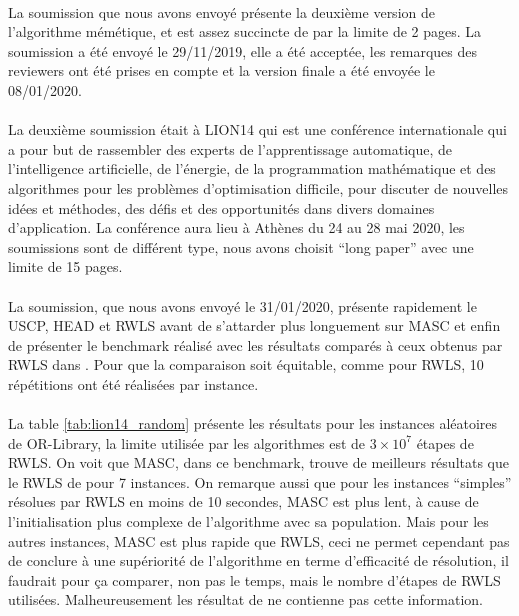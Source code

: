 \documentclass[a4paper,11pt,twoside,french,report]{../common/simplem}
\begin{document}
				\paragraph*{}
					La soumission que nous avons envoyé présente la deuxième version de l'algorithme mémétique, et est assez succincte de par la limite de 2 pages. La soumission a été envoyé le 29/11/2019, elle a été acceptée, les remarques des reviewers ont été prises en compte et la version finale a été envoyée le 08/01/2020.
				\paragraph*{}
					La deuxième soumission était à \acrshort{LION14} qui est une conférence internationale qui a pour but de rassembler des experts de l'apprentissage automatique, de l'intelligence artificielle, de l'énergie, de la programmation mathématique et des algorithmes pour les problèmes d'optimisation difficile, pour discuter de nouvelles idées et méthodes, des défis et des opportunités dans divers domaines d'application. La conférence aura lieu à Athènes du 24 au 28 mai 2020, les soumissions sont de différent type, nous avons choisit ``long paper'' avec une limite de 15 pages.
				\paragraph*{}
					La soumission, que nous avons envoyé le 31/01/2020, présente rapidement le \gls{USCP}, \gls{HEAD} et \gls{RWLS} avant de s'attarder plus longuement sur \gls{MASC} et enfin de présenter le benchmark réalisé avec les résultats comparés à ceux obtenus par \gls{RWLS} dans \cite{Gao2015}. Pour que la comparaison soit équitable, comme pour \gls{RWLS}, 10 répétitions ont été réalisées par instance.
				\paragraph*{}
					La table \ref{tab:lion14_random} présente les résultats pour les instances aléatoires de OR-Library, la limite utilisée par les algorithmes est de \(3 \times 10^7\) étapes de \gls{RWLS}. On voit que \gls{MASC}, dans ce benchmark, trouve de meilleurs résultats que le \gls{RWLS} de \cite{Gao2015} pour 7 instances. On remarque aussi que pour les instances ``simples'' résolues par \gls{RWLS} en moins de 10 secondes, \gls{MASC} est plus lent, à cause de l'initialisation plus complexe de l'algorithme avec sa population. Mais pour les autres instances, \gls{MASC} est plus rapide que \gls{RWLS}, ceci ne permet cependant pas de conclure à une supériorité de l'algorithme en terme d'efficacité de résolution, il faudrait pour ça comparer, non pas le temps, mais le nombre d'étapes de \gls{RWLS} utilisées. Malheureusement les résultat de \cite{Gao2015} ne contienne pas cette information.
\end{document}
